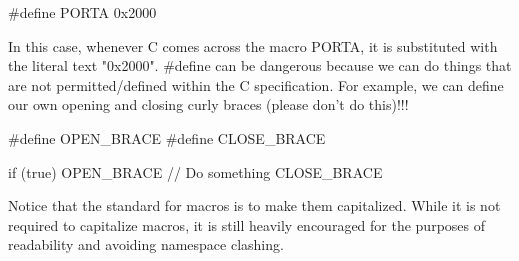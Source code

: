 \documentclass{article}
\begin{document}
\begin{clst}
#define PORTA 0x2000
\end{clst}

In this case, whenever C comes across the macro PORTA, it is substituted with the literal text "0x2000".
\#define can be dangerous because we can do things that are not permitted/defined within the C specification.
For example, we can define our own opening and closing curly braces (please don't do this)!!!

\begin{clst}
#define OPEN_BRACE {
#define CLOSE_BRACE }

if (true) OPEN_BRACE
// Do something
CLOSE_BRACE
\end{clst}

Notice that the standard for macros is to make them capitalized. While it is not required to capitalize
macros, it is still heavily encouraged for the purposes of readability and avoiding namespace clashing.
\end{document}
